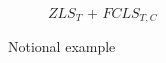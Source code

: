 \begin{figure}[!t]
\begin{subfigure}{0.18\linewidth}
\caption{$ZLS_{T}$ + $FCLS_{T,C}$}
\label{}
\end{subfigure}
\caption{Notional example}
\label{fig:example_sub}
\end{figure}
